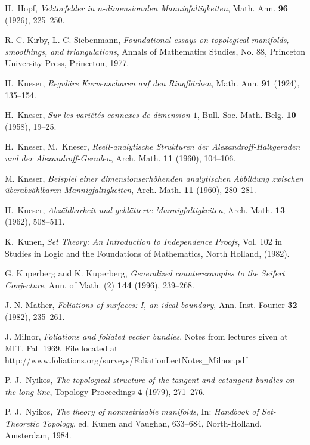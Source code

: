 \documentclass{amsart}
\begin{document}
\begin{thebibliography}{30}
H.~Hopf, \textsl{Vektorfelder in $n$-dimensionalen
Mannigfaltigkeiten},
 Math. Ann. {\bf 96} (1926), 225--250.

R. C. Kirby, L. C. Siebenmann, {\em Foundational essays on
topological manifolds, smoothings, and triangulations}, Annals
of Mathematics Studies, No. 88, Princeton University Press,
Princeton, 1977. 

H.~Kneser, \textsl{Regul\"are Kurvenscharen auf den
Ringfl\"achen}, Math. Ann. {\bf 91} (1924), 135--154.

H.~Kneser, \textsl{Sur les vari\'et\'es connexes de dimension
$1$}, Bull. Soc. Math. Belg. {\bf 10} (1958), 19--25.

H.~Kneser, M.~Kneser, \textsl{Reell-analytische Strukturen der
Alexandroff-Halbgeraden und der Alexandroff-Geraden}, Arch.
Math. {\bf 11} (1960), 104--106.

M. Kneser, \textsl{Beispiel einer dimensionserh\"ohenden
analytischen Abbildung zwischen \"uber\-abz\"ahlbaren
Mannigfaltigkeiten},
 Arch. Math. {\bf 11} (1960), 280--281.

H.~Kneser, \textsl{Abz\"ahlbarkeit und gebl\"atterte
Mannigfaltigkeiten}, Arch. Math. {\bf 13} (1962), 508--511.

K.~Kunen, \textsl{Set Theory: An Introduction to Independence Proofs}, Vol. 102 in Studies in Logic and
the Foundations of Mathematics, North Holland, (1982).

G. Kuperberg and K. Kuperberg, \textsl{Generalized
counterexamples to the Seifert Conjecture}, Ann. of Math. (2)
{\bf 144} (1996), 239--268.

J. N. Mather, \textsl{Foliations of surfaces: I, an ideal
boundary}, Ann. Inst. Fourier {\bf 32} (1982), 235--261.

J. Milnor, \textsl{Foliations and foliated vector bundles},
Notes from lectures given at MIT, Fall 1969. File located at
http://www.foliations.org/surveys/FoliationLectNotes\_Milnor.pdf

P. J.~Nyikos, \textsl{The topological structure of the tangent
and cotangent bundles on the long line}, Topology Proceedings
{\bf 4} (1979), 271--276.

\fi

P. J.~Nyikos, \textsl{The theory of nonmetrisable manifolds},
In: {\em Handbook of Set-Theoretic Topology}, ed.
 Kunen and Vaughan, 633--684, North-Holland,
Amsterdam, 1984.


\end{thebibliography}
\end{document}
